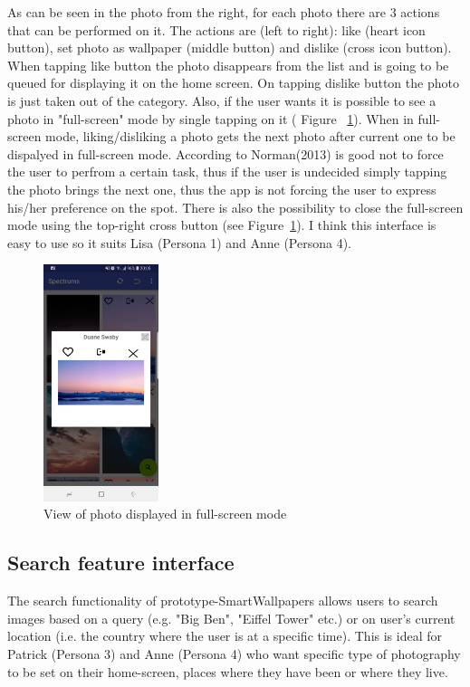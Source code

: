 \documentclass[version=last,fontsize=13pt]{scrartcl}
\begin{document}
	As can be seen in the photo from the right, for each photo there are 3 actions that can be performed on it. The actions are (left to right): like (heart icon button), set photo as wallpaper (middle button) and dislike (cross icon button). When tapping like button the photo disappears from the list and is going to be queued for displaying it on the home screen. On tapping dislike button the photo is just taken out of the category. Also, if the user wants it is possible to see a photo in "full-screen" mode by single tapping on it ( Figure ~\ref{fig:fullscreen}). When in full-screen mode, liking/disliking a photo gets the next photo after current one to be dispalyed in full-screen mode. According to Norman(2013) is good not to force the user to perfrom a certain task, thus if the user is undecided simply tapping the photo brings the next one, thus the app is not forcing the user to express his/her preference on the spot. There is also the possibility to close the full-screen mode using the top-right cross button (see Figure~\ref{fig:fullscreen}). I think this interface is easy to use so it suits Lisa (Persona 1) and Anne (Persona 4).\\

\begin{figure}[H]

	\centering
	\includegraphics[width = 0.3\textwidth]{imgs/FSPhoto.jpg}
	\caption{View of photo displayed in full-screen mode}
	\label{fig:fullscreen}

\end{figure}

\subsection{Search feature interface}
	The search functionality of prototype-SmartWallpapers allows users to search images based on a query (e.g. "Big Ben", "Eiffel Tower" etc.) or on user's current location (i.e. the country where the user is at a specific time). This is ideal for Patrick (Persona 3) and Anne (Persona 4) who want specific type of photography to be set on their home-screen, places where they have been or where they live.
\end{document}
